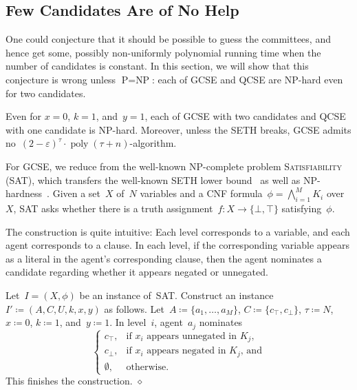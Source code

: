 \documentclass[10pt,a4paper,twocolumn]{article}
\theoremstyle{plain}
\theoremstyle{definition}
\theoremstyle{remark}
\newcommand{\cqed}{\hfill$\diamond$}
\newcommand{\prob}[1]{\textnormal{\textsc{#1}}}
\newcommand{\cocl}[1]{\textrm{#1}}
\newcommand{\NP}{\cocl{NP}}
\newcommand{\classP}{\cocl{P}}
\newcommand{\ceq}{\coloneqq}
\newcommand{\false}{\bot}
\newcommand{\true}{\top}
\DeclareMathOperator{\poly}{poly}
\newcommand{\eps}{\varepsilon}
\newcommand{\smlaAcr}{\prob{GCSE}}
\newcommand{\fmlaAcr}{\prob{QCSE}}
\newcommand{\appsymb}{$\star$}
\newcommand{\appref}[1]{{\hyperref[proof:#1]{\appsymb}}}
\begin{document}
{%
%
%
\subsection{Few Candidates Are of No Help}
\label{ssec:fewcandidates}

One could conjecture that it should be possible to guess the committees,
and hence get some, possibly non-uniformly polynomial running time
when the number of candidates is constant.
In this section,
we will show that this 
conjecture is wrong unless $\classP=\NP$:
each of \smlaAcr{} and \fmlaAcr{} are \NP-hard even for two candidates.

\begin{theorem}[\appref{thm:constmxyk}]
 \label{thm:constmxyk}
 Even for $x=0$,
 $k=1$,
 and~$y=1$,
 each of \smlaAcr{} with two candidates and 
 \fmlaAcr{} with one candidate is \NP-hard.
%
 Moreover, 
 unless the SETH breaks, 
 \smlaAcr{}
 admits no~$(2 -\eps)^\tau \cdot \poly(\tau + n)$-algorithm.
\end{theorem}

For \smlaAcr{},
%
we reduce
from the 
well-known \NP-complete problem
\textsc{Satisfiability (SAT)},
which transfers the well-known SETH lower bound~\cite{ImpagliazzoP01}
as well as NP-hardness~\cite{GareyJ79}.
Given
a set~$X$ of~$N$ variables and a CNF formula~$\phi=\bigwedge_{i=1}^M K_i$ over~$X$,
SAT asks whether 
there is a truth assignment~$f\colon X \to \{\false,\true\}$ satisfying~$\phi$.

The construction is quite intuitive:
Each level corresponds to a variable,
and each agent corresponds to a clause.
In each level,
if the corresponding variable appears as a literal in the agent's corresponding clause,
then the agent nominates a candidate regarding whether it appears negated or unnegated.

\begin{construction}
 \label{constr:constmxyk}
 Let~$I=(X,\phi)$ be an instance of~SAT.
 Construct an instance~$I'\ceq (A,C,U,k,x,y)$
 as follows.
 Let~$A\ceq\{a_1,\dots,a_M\}$,
 $C\ceq\{c_\true,c_\false\}$,
 $\tau\ceq N$,
 $x\ceq 0$, 
 $k\ceq 1$,
 and~$y\ceq 1$.
 In level~$i$,
 agent~$a_j$ nominates
 \[
  \begin{cases}
    c_\true, &\text{if $x_i$ appears unnegated in~$K_j$,}\\
    c_\false, &\text{if $x_i$ appears negated in~$K_j$, and}\\
    \emptyset, & \text{otherwise}.
  \end{cases}
 \]
 This finishes the construction.
 \cqed
\end{construction}

}
\end{document}
